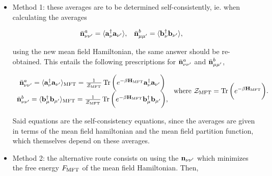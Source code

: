 \documentclass{homework}
\begin{document}
\begin{itemize}
    \item Method 1: these averages are to be determined self-consistently, ie. when calculating the averages 
    
    \begin{align}
        \bar{{\bf n}}_{\nu \nu'}^{a} &= \langle {\bf a}_{\nu}^\dagger {\bf a}_{\nu'} \rangle, & \bar{{\bf n}}_{\mu \mu'}^{b} &= \langle {\bf b}_{\nu}^\dagger {\bf b}_{\nu'} \rangle,
    \end{align}
    
    using the new mean field Hamiltonian, the same answer should be re-obtained. This entails the following prescriptions for $\bar{{\bf n}}_{\nu \nu'}^{a}$ and $\bar{{\bf n}}_{\mu \mu'}^{b}$,
    
     \begin{align} 
     \begin{array}{c}
        \bar{{\bf n}}_{\nu \nu'}^{a} = \langle {\bf a}_{\nu}^\dagger {\bf a}_{\nu'} \rangle_{\textnormal{MFT}} = \frac{1}{\mathcal{Z}_{\textnormal{MFT}}} \Tr \bigg(e^{-\beta {\bf H}_{\textnormal{MFT}}} {\bf a}_{\nu}^\dagger {\bf a}_{\nu'}\bigg) \\ \bar{{\bf n}}_{\nu \nu'}^{b} = \langle {\bf b}_{\mu}^\dagger {\bf b}_{\mu'} \rangle_{\textnormal{MFT}} = \frac{1}{\mathcal{Z}_{\textnormal{MFT}}} \Tr \bigg(e^{-\beta {\bf H}_{\textnormal{MFT}}} {\bf b}_{\mu}^\dagger {\bf b}_{\mu'}\bigg),
     \end{array} \textnormal{ where } \mathcal{Z}_{\textnormal{MFT}} = \Tr \bigg(e^{-\beta {\bf H}_{\textnormal{MFT}}}\bigg).
    \end{align}
    
    Said equations are the self-consistency equations, since the averages are given in terms of the mean field hamiltonian and the mean field partition function, which themselves depend on these averages. \\
    
    \item Method 2: the alternative route consists on using the ${\bf n}_{\nu \nu'}$ which minimizes the free energy $F_{\textnormal{MFT}}$ of the mean field Hamiltonian. Then, 
    

\end{itemize}
\end{document}
